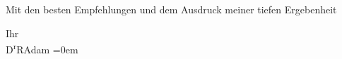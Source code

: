 \pstart
           Mit den besten Empfehlungen und {\pb}dem
               Ausdruck meiner tiefen Ergebenheit\pend
           
\pstart
           Ihr{\\[\baselineskip]}\spacefill\mbox{D\textsuperscript{r}RAdam}\pend
           \leftskip=0em{}\endnumbering{}  \newcommand{\dateiname}{L02497}\newcommand{\titel}{Robert Adam an Arthur Schnitzler, 30. 12. 1927}\newcommand{\editorInnen}{Martin Anton Müller und Gerd-Hermann Susen}
